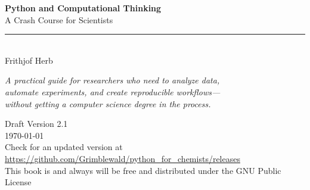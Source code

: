 
\begin{titlepage}
    \centering

    \vspace*{2cm}

    {\Huge\bfseries\color{codeblue} Python and Computational Thinking}\\[1cm]

    {\LARGE A Crash Course for Scientists}\\[2cm]

    \rule{0.6\textwidth}{0.4pt}\\[1.5cm]

    {\Large Frithjof Herb}\\[3cm]

    \vfill

    {\large\itshape
    A practical guide for researchers who need to analyze data,\\
    automate experiments, and create reproducible workflows---\\
    without getting a computer science degree in the process.
    }

    \vfill

    {\large Draft Version 2.1}\\[0.5cm]
    {\large \today}\\[0.5cm]
	{\large Check for an updated version at \url{https://github.com/Grimblewald/python_for_chemists/releases}}\\[0.5cm]
	{\large This book is and always will be free and distributed under the GNU Public License}

\end{titlepage}

\cleardoublepage
